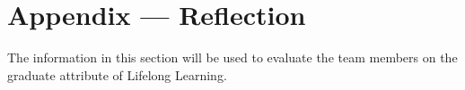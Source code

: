 \documentclass[12pt, titlepage]{article}
\begin{document}


\newpage{}
\section*{Appendix --- Reflection}


The information in this section will be used to evaluate the team members on the
graduate attribute of Lifelong Learning.


\end{document}
